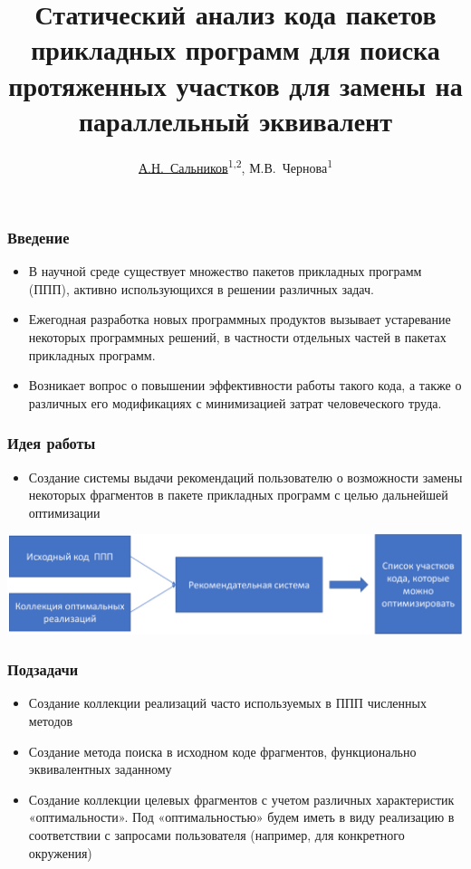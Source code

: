 \documentclass{beamer}
\title[]%
{Статический анализ кода пакетов прикладных программ для поиска протяженных
        участков для замены на параллельный эквивалент}
\author[А.Н.~Сальников, М.В.~Чернова]
{
    \underline{А.Н.~Сальников}\textsuperscript{1,2},
               М.В.~Чернова\textsuperscript{1}
}
\institute{
             ВМК МГУ имени М.В. Ломоносова\textsuperscript{1},\newline
             ФИЦ ИУ РАН\textsuperscript{2},\newline
}
\date{}
\begin{document}

\begin{frame}
	\titlepage
\end{frame}




\begin{frame}
\frametitle{Введение}
\begin{itemize}
	\item В научной среде существует множество пакетов прикладных
программ (ППП), активно использующихся в решении различных
задач.
	\item Ежегодная разработка новых программных продуктов вызывает
устаревание некоторых программных решений, в частности
отдельных частей в пакетах прикладных программ.
	\item Возникает вопрос о повышении эффективности работы такого
кода, а также о различных его модификациях с минимизацией
затрат человеческого труда.
\end{itemize}
\end{frame}

\begin{frame}
\frametitle{Идея работы}
\begin{itemize}
	\item Создание системы выдачи рекомендаций пользователю о возможности замены
	 некоторых фрагментов в пакете прикладных программ с целью дальнейшей оптимизации
\end{itemize}

\includegraphics[width=\textwidth]{img/idea.eps}
\end{frame}

\begin{frame}
\frametitle{Подзадачи}
\begin{itemize}
	\item Создание коллекции реализаций часто используемых в ППП численных методов
	\item Создание метода поиска в исходном коде фрагментов, функционально
	 эквивалентных заданному
	\item Создание коллекции целевых фрагментов с учетом различных характеристик
	 «оптимальности». Под «оптимальностью» будем иметь в виду реализацию в
	  соответствии с запросами пользователя (например, для конкретного окружения)
\end{itemize}
\end{frame}
\end{document}
